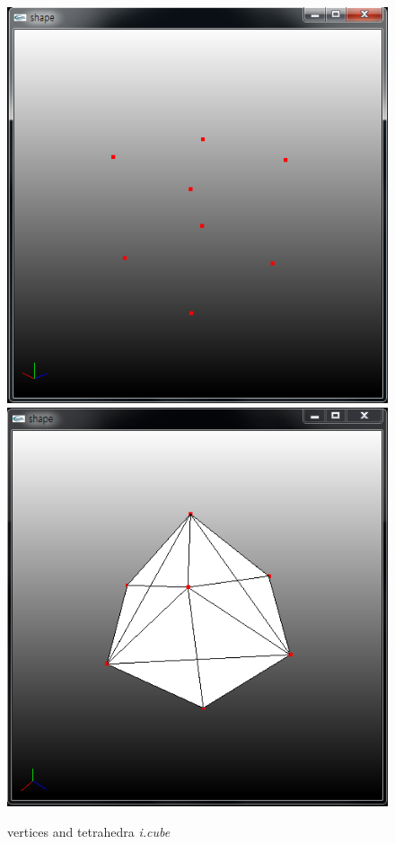 \documentclass[11pt]{article}
\begin{document}
\begin{figure}
\vspace{1cm}
\includegraphics[width=.5\textwidth]{FIGS/icube-vertices}
\hspace{1cm}
\includegraphics[width=.5\textwidth]{FIGS/icube-tetra}
\caption{vertices and tetrahedra \textit{i.cube}}
\end{figure}
\end{document}
